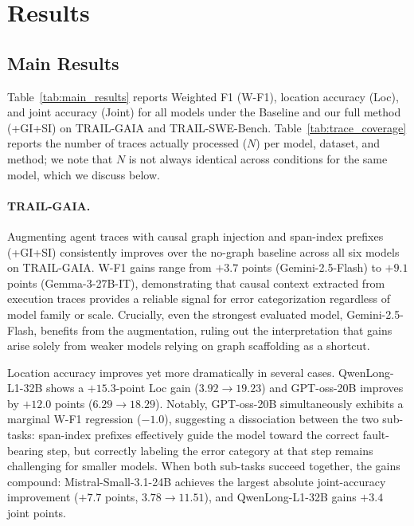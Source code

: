 
\section{Results}

\subsection{Main Results}

Table~\ref{tab:main_results} reports Weighted F1 (W-F1), location accuracy (Loc), and
joint accuracy (Joint) for all models under the Baseline and our full method (+GI+SI)
on TRAIL-GAIA and TRAIL-SWE-Bench.
Table~\ref{tab:trace_coverage} reports the number of traces actually processed ($N$)
per model, dataset, and method; we note that $N$ is not always identical across
conditions for the same model, which we discuss below.

\paragraph{TRAIL-GAIA.}
Augmenting agent traces with causal graph injection and span-index prefixes (+GI+SI)
consistently improves over the no-graph baseline across all six models on TRAIL-GAIA.
W-F1 gains range from $+3.7$ points (Gemini-2.5-Flash) to $+9.1$ points
(Gemma-3-27B-IT), demonstrating that causal context extracted from execution traces
provides a reliable signal for error categorization regardless of model family or
scale.
Crucially, even the strongest evaluated model, Gemini-2.5-Flash, benefits from the
augmentation, ruling out the interpretation that gains arise solely from weaker models
relying on graph scaffolding as a shortcut.

Location accuracy improves yet more dramatically in several cases.
QwenLong-L1-32B shows a $+15.3$-point Loc gain ($3.92 \to 19.23$) and
GPT-oss-20B improves by $+12.0$ points ($6.29 \to 18.29$).
Notably, GPT-oss-20B simultaneously exhibits a marginal W-F1 regression ($-1.0$),
suggesting a dissociation between the two sub-tasks: span-index prefixes effectively
guide the model toward the correct fault-bearing step, but correctly labeling the
error category at that step remains challenging for smaller models.
When both sub-tasks succeed together, the gains compound: Mistral-Small-3.1-24B
achieves the largest absolute joint-accuracy improvement ($+7.7$ points,
$3.78 \to 11.51$), and QwenLong-L1-32B gains $+3.4$ joint points.

